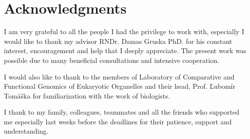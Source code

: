 \chapter*{Acknowledgments}

I am very grateful to all the people I had the privilege to work with, especially I would like to thank my advisor RNDr. Damas Gruska PhD. for his constant interest, encouragement and help that I deeply appreciate.
The present work was possible due to many beneficial consultations and intensive cooperation.

I would also like to thank to the members of Laboratory of Comparative and Functional Genomics of Eukaryotic Organelles and their head, Prof. Ľubomír Tomáška for familiarization with the work of biologists.

I thank to my family, colleagues, teammates and all the friends who supported me especially last weeks before the deadlines for their patience, support and understanding. %

